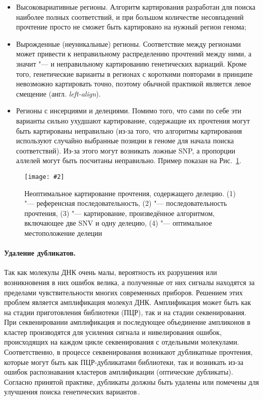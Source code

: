 \documentclass[a4paper,14pt]{extarticle}
\newcommand{\centerfigure}[5]
{\begin{figure}[#1]\centering\texttt{[image: \#2]}\caption{\label{#3}#4}\end{figure}}
\newcommand{\picref}[1]{Рис.~\ref{#1}}
\newcommand{\engterm}[1]{англ. \textenglish{\textit{#1}}}
\begin{document}
\begin{itemize}
	\item Высоковариативные регионы.
	      Алгоритм картирования разработан для поиска наиболее полных соответствий, и при большом количестве несовпадений прочтение просто не сможет быть картировано на нужный регион генома;
	\item Вырожденные (неуникальные) регионы.
	      Соответствие между регионами может привести к неправильному распределению прочтений между ними, а значит "--- и неправильному картированию генетических вариаций.
	      Кроме того, генетические варианты в регионах с короткими повторами в принципе невозможно картировать точно, поэтому обычной практикой является левое смещение (\engterm{left-align}).
	\item Регионы с инсерциями и делециями.
	      Помимо того, что сами по себе эти варианты сильно ухудшают картирование, содержащие их прочтения могут быть картированы неправильно (из-за того, что алгоритмы картирования используют случайно выбранные позиции в геноме для начала поиска соответствий).
	      Из-за этого могут возникать ложные SNP, а пропорции аллелей могут быть посчитаны неправильно.
	      Пример показан на \picref{fig:indels}.
\end{itemize}

\centerfigure{h}{Indels.pdf}{fig:indels}{Неоптимальное картирование прочтения, содержащего делецию. (1) "--- референсная последовательность, (2) "--- последовательность прочтения, (3) "--- картирование, произведённое алгоритмом, включающее две SNV и одну делецию, (4) "--- оптимальное местоположение делеции}{0.7}

\paragraph{Удаление дубликатов.}
Так как молекулы ДНК очень малы, вероятность их разрушения или возникновения в них ошибок велика, а полученные от них сигналы находятся за пределами чувствительности многих современных приборов.
Решением этих проблем является амплификация молекул ДНК.
Амплификация может быть как на стадии приготовления библиотеки (ПЦР), так и на стадии секвенирования.
При секвенировании амплификация и последующее объединение ампликонов в кластер производятся для усиления сигнала и нивелирования ошибок, происходящих на каждом цикле секвенирования с отдельными молекулами.
Соответственно, в процессе секвенирования возникают дубликатные прочтения, которые могут быть как ПЦР\hyp{}дубликатами библиотеки, так и возникать из-за ошибок распознавания кластеров амплификации (оптические дубликаты).
Согласно принятой практике, дубликаты должны быть удалены или помечены для улучшения поиска генетических вариантов\,\citep{Auwera_2013}.
\end{document}
